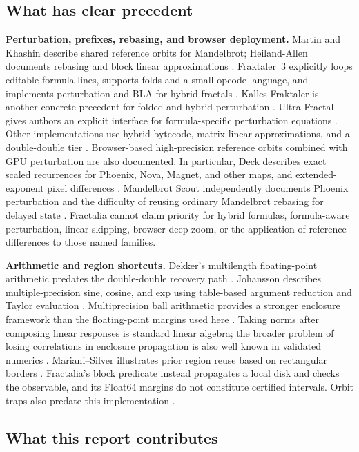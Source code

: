 \documentclass[11pt,a4paper]{article}
\numberwithin{equation}{section}
\begin{document}
\subsection{What has clear precedent}

\textbf{Perturbation, prefixes, rebasing, and browser deployment.}
Martin and Khashin describe shared reference orbits for Mandelbrot;
Heiland-Allen documents rebasing and block linear approximations
\cite{martin,khashin,heiland}. Fraktaler~3 explicitly loops editable
formula lines, supports folds and a small opcode language, and
implements perturbation and BLA for hybrid fractals
\cite{fraktaler}. Kalles Fraktaler is another concrete precedent for
folded and hybrid perturbation \cite{kf}. Ultra Fractal gives authors
an explicit interface for formula-specific perturbation equations
\cite{ultrafractal}. Other implementations use hybrid bytecode,
matrix linear approximations, and a double-double tier
\cite{fractall}. Browser-based high-precision reference orbits
combined with GPU perturbation are also documented. In particular,
Deck describes exact scaled recurrences for Phoenix, Nova, Magnet,
and other maps, and extended-exponent pixel differences \cite{deck}.
Mandelbrot Scout independently documents Phoenix perturbation and
the difficulty of reusing ordinary Mandelbrot rebasing for delayed
state \cite{scout}.
Fractalia cannot claim priority for hybrid formulas, formula-aware
perturbation, linear skipping, browser deep zoom, or the application
of reference differences to those named families.

\textbf{Arithmetic and region shortcuts.}
Dekker's multilength floating-point arithmetic predates the
double-double recovery path \cite{dekker}. Johansson describes
multiple-precision sine, cosine, and exp using table-based argument
reduction and Taylor evaluation \cite{johansson}. Multiprecision
ball arithmetic provides a stronger enclosure framework than the
floating-point margins used here \cite{arb}. Taking norms after
composing linear responses is standard linear algebra; the broader
problem of losing correlations in enclosure propagation is also
well known in validated numerics \cite{makino}. Mariani--Silver
illustrates prior region reuse based on rectangular borders
\cite{mariani}. Fractalia's block predicate instead propagates a
local disk and checks the observable, and its Float64 margins do not
constitute certified intervals. Orbit traps also predate this
implementation \cite{traps}.

\subsection{What this report contributes}
\end{document}

